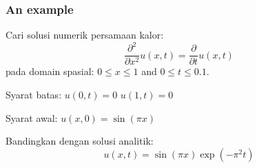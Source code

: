 \documentclass[9pt]{beamer}
\begin{document}
\begin{frame}
\frametitle{An example}

Cari solusi numerik persamaan kalor:
\begin{equation*}
\frac{\partial^{2}}{\partial x^2} u(x,t) = \frac{\partial}{\partial t} u(x,t)
\end{equation*}
pada domain spasial: $0 \leq x \leq 1$ and $0 \leq t \leq 0.1$.

Syarat batas: $u(0,t) = 0$ $u(1,t) = 0$

Syarat awal: $u(x,0) = \sin(\pi x)$

%
Bandingkan dengan solusi analitik:
\begin{equation}
u(x,t) = \sin(\pi x) \exp(-\pi^2 t)
\end{equation}

\end{frame}
\end{document}
